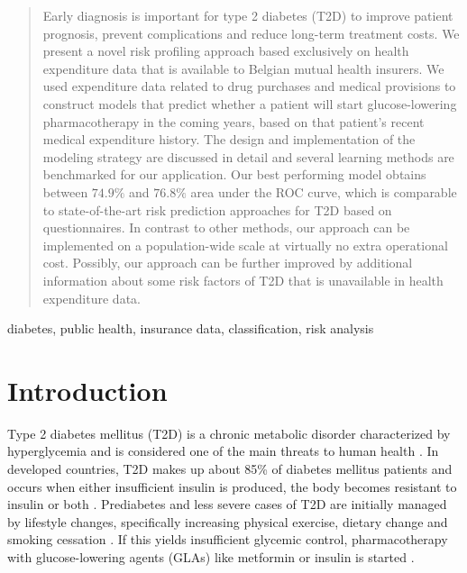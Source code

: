 \documentclass[twoside,11pt]{article}
\begin{document}
\begin{abstract}%
Early diagnosis is important for type 2 diabetes (T2D) to improve patient prognosis, prevent complications and reduce long-term treatment costs. We present a novel risk profiling approach based exclusively on health expenditure data that is available to Belgian mutual health insurers. We used expenditure data related to drug purchases and medical provisions to construct models that predict whether a patient will start glucose-lowering pharmacotherapy in the coming years, based on that patient's recent medical expenditure history. The design and implementation of the modeling strategy are discussed in detail and several learning methods are benchmarked for our application. Our best performing model obtains between $74.9\%$ and $76.8\%$ area under the ROC curve, which is comparable to state-of-the-art risk prediction approaches for T2D based on questionnaires. In contrast to other methods, our approach can be implemented on a population-wide scale at virtually no extra operational cost. Possibly, our approach can be further improved by additional information about some risk factors of T2D that is unavailable in health expenditure data.
\end{abstract}

\begin{keywords}
diabetes, public health, insurance data, classification, risk analysis
\end{keywords}

%
%

\section{Introduction}
Type 2 diabetes mellitus (T2D) is a chronic metabolic disorder characterized by hyperglycemia and is considered one of the main threats to human health \citep{zimmet2001global}. In developed countries, T2D makes up about 85\% of diabetes mellitus patients and occurs when either insufficient insulin is produced, the body becomes resistant to insulin or both \citep{world1994prevention}. Prediabetes and less severe cases of T2D are initially managed by lifestyle changes, specifically increasing physical exercise, dietary change and smoking cessation \citep{tuomilehto2001prevention, diabetes2002reduction, american2014standards}. If this yields insufficient glycemic control, pharmacotherapy with glucose-lowering agents (GLAs) like metformin or insulin is started \citep{turner1999glycemic, american2014standards}.
\end{document}
